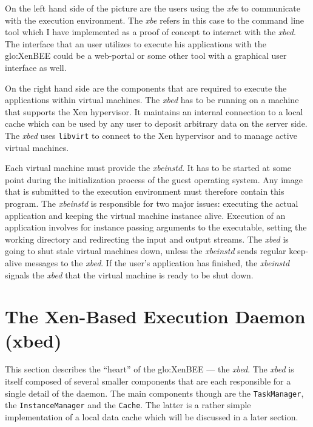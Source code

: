 On the left hand side of the picture are the users using the \emph{xbe} to
communicate with the execution  environment. The \emph{xbe} refers in this
case  to the command  line tool  which I  have implemented  as a  proof of
concept  to interact  with the  \emph{xbed}.  The  interface that  an user
utilizes to execute his applications  with the \gls{glo:XenBEE} could be a
web-portal or some other tool with a graphical user interface as well.

\medskip

On the right hand side are the components that are required to execute the
applications within  virtual machines.  The \emph{xbed} has  to be running
on a machine  that supports the Xen hypervisor.   It maintains an internal
connection  to a local  cache which  can be  used by  any user  to deposit
arbitrary data on the  server side.  The \emph{xbed} uses \texttt{libvirt}
to connect to the Xen hypervisor and to manage active virtual machines.

Each  virtual machine  must  provide  the \emph{xbeinstd}.  It  has to  be
started  at some  point during  the  initialization process  of the  guest
operating system. Any image that is submitted to the execution environment
must therefore  contain this  program. The \emph{xbeinstd}  is responsible
for two  major issues:  executing the actual  application and  keeping the
virtual machine instance alive.   Execution of an application involves for
instance  passing  arguments  to   the  executable,  setting  the  working
directory and redirecting the input and output streams. The \emph{xbed} is
going  to shut  stale virtual  machines down,  unless  the \emph{xbeinstd}
sends  regular keep-alive  messages  to the  \emph{xbed}.   If the  user's
application has finished, the \emph{xbeinstd} signals the \emph{xbed} that
the virtual machine is ready to be shut down.

\section[The Xen-Based Execution Daemon]{The Xen-Based Execution Daemon (xbed)}
\label{sec:xbed}

This  section describes  the  ``heart'' of  the  \gls{glo:XenBEE} ---  the
\emph{xbed}.   The  \emph{xbed}  is  itself composed  of  several  smaller
components that  are each responsible for  a single detail  of the daemon.
The   main   components   though   are   the   \texttt{TaskManager},   the
\texttt{InstanceManager} and  the \texttt{Cache}.  The latter  is a rather
simple implementation of  a local data cache which will  be discussed in a
later section.

